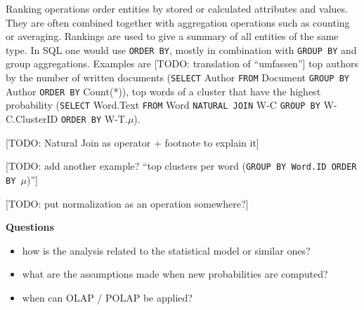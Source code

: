 Ranking operations order entities by stored or calculated attributes and values. They are often combined together with aggregation operations such as counting or averaging. Rankings are used to give a summary of all entities of the same type. In SQL one would use \texttt{ORDER BY}, mostly in combination with \texttt{GROUP BY} and group aggregations. Examples are [TODO: translation of ``umfassen''] top authors by the number of written documents (\texttt{SELECT} Author \texttt{FROM} Document \texttt{GROUP BY} Author \texttt{ORDER BY} Count(*)), top words of a cluster that have the highest probability (\texttt{SELECT} Word.Text \texttt{FROM} Word \texttt{NATURAL JOIN} W-C \texttt{GROUP BY} W-C.ClusterID \texttt{ORDER BY} W-T.$\mu$).

[TODO: Natural Join as operator + footnote to explain it]

[TODO: add another example? ``top clusters per word (\texttt{GROUP BY \textrm{Word.ID} ORDER BY $\mu$})'']

[TODO: put normalization as an operation somewhere?]

\textbf{Questions}
\begin{itemize}
\item how is the analysis related to the statistical model or similar ones?
\item what are the assumptions made when new probabilities are computed?
\item when can OLAP / POLAP be applied?
\end{itemize}
